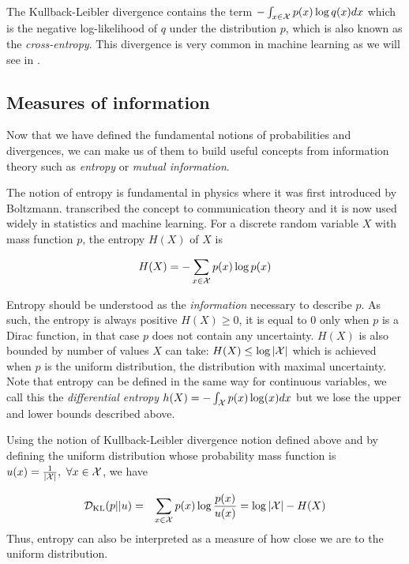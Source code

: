 The Kullback-Leibler divergence contains the term $-\int_{x \in {\mathcal{X}}}  p(x) \log q(x) dx$ which is the negative log-likelihood of $q$ under the distribution $p$, which is also known as the \emph{cross-entropy}. This divergence is very common in machine learning as we will see in .

\subsection{Measures of information}
Now that we have defined the fundamental notions of probabilities and divergences, we can make us of them to build useful concepts from information theory such as \emph{entropy} or \emph{mutual information}.


The notion of entropy is fundamental in physics where it was first introduced by Boltzmann. \citet{shannon1948mathematical} transcribed the concept to communication theory and it is now used widely in statistics and machine learning. For a discrete random variable $X$ with mass function $p$, the entropy $H(X)$ of $X$ is  

\begin{equation}
\label{eq:entropy}
    H(X) = - \sum_{x \in {\mathcal{X}}} p(x) \log p(x)
\end{equation}

Entropy should be understood as the \emph{information} necessary to describe $p$. As such, the entropy is always positive $H(X) \ge 0$, it is equal to $0$ only when $p$ is a Dirac function, in that case $p$ does not contain any uncertainty.
$H(X)$ is also bounded by number of values $X$ can take: $H(X) \le \log | {\mathcal{X}} |$ which is achieved when $p$ is the uniform distribution, the distribution with maximal uncertainty. Note that entropy can be defined in the same way for continuous variables, we call this the \emph{differential entropy} $h(X) = - \int_{{\mathcal{X}}} p(x) \log (x) dx$ but we lose the upper and lower bounds described above.

Using the notion of Kullback-Leibler divergence notion defined above and by defining the uniform distribution whose probability mass function is $u(x) = \frac{1}{|{\mathcal{X}}|}, \ \forall x \in {\mathcal{X}}$, we have

\begin{eqnarray*}
    {\mathcal{D}}_{\mathrm{KL}}(p||u) &=& \sum_{x \in {\mathcal{X}}} p(x) \log \frac{p(x)}{u(x)} 
    =\log |{\mathcal{X}}| - H(X)
\end{eqnarray*}
Thus, entropy can also be interpreted as a measure of how close we are to the uniform distribution.

